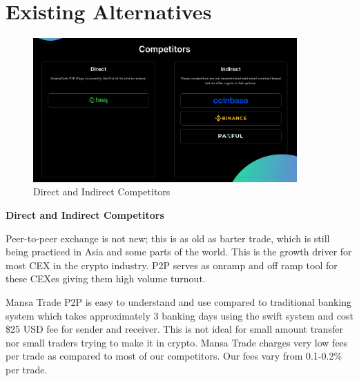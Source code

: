 \documentclass{article}
\begin{document}
\section{Existing Alternatives}

\begin{figure}[h]
  \begin{center}
    \centering
    \includegraphics[width=0.9\textwidth]{fig/alts.png}
    \caption[Fig 3]{Direct and Indirect Competitors\label{fig:poh_insert}}
  \end{center}
\end{figure}

\textbf{Direct and Indirect Competitors}

Peer-to-peer exchange is not new; this is as old as barter trade, which is still being practiced in Asia and some parts of the world. This is the growth driver for most CEX in the crypto industry. P2P serves as onramp and off ramp tool for these CEXes giving them high volume turnout.

Mansa Trade P2P is easy to understand and use compared to traditional banking system which takes approximately 3 banking days using the swift system and cost \$25 USD fee for sender and receiver. This is not ideal for small amount transfer nor small traders trying to make it in crypto. Mansa Trade charges very low fees per trade as compared to most of our competitors. Our fees vary from 0.1-0.2\% per trade.
\end{document}
